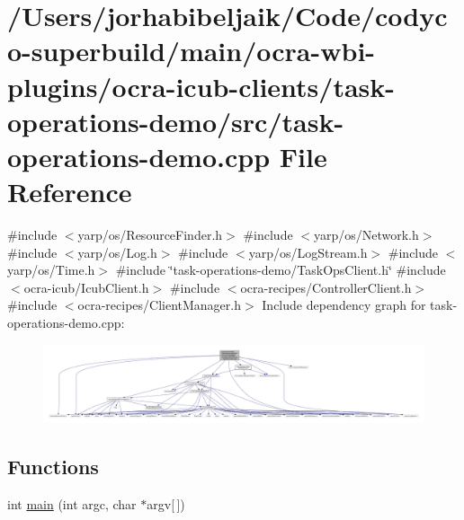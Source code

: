 \hypertarget{task-operations-demo_8cpp}{}\section{/\+Users/jorhabibeljaik/\+Code/codyco-\/superbuild/main/ocra-\/wbi-\/plugins/ocra-\/icub-\/clients/task-\/operations-\/demo/src/task-\/operations-\/demo.cpp File Reference}
\label{task-operations-demo_8cpp}
{\ttfamily \#include $<$yarp/os/\+Resource\+Finder.\+h$>$}\newline
{\ttfamily \#include $<$yarp/os/\+Network.\+h$>$}\newline
{\ttfamily \#include $<$yarp/os/\+Log.\+h$>$}\newline
{\ttfamily \#include $<$yarp/os/\+Log\+Stream.\+h$>$}\newline
{\ttfamily \#include $<$yarp/os/\+Time.\+h$>$}\newline
{\ttfamily \#include \char`\"{}task-\/operations-\/demo/\+Task\+Ops\+Client.\+h\char`\"{}}\newline
{\ttfamily \#include $<$ocra-\/icub/\+Icub\+Client.\+h$>$}\newline
{\ttfamily \#include $<$ocra-\/recipes/\+Controller\+Client.\+h$>$}\newline
{\ttfamily \#include $<$ocra-\/recipes/\+Client\+Manager.\+h$>$}\newline
Include dependency graph for task-\/operations-\/demo.cpp\+:
\nopagebreak
\begin{figure}[H]
\begin{center}
\leavevmode
\includegraphics[width=350pt]{task-operations-demo_8cpp__incl}
\end{center}
\end{figure}
\subsection*{Functions}
\begin{DoxyCompactItemize}
\item 
int \hyperlink{task-operations-demo_8cpp_a0ddf1224851353fc92bfbff6f499fa97}{main} (int argc, char $\ast$argv\mbox{[}$\,$\mbox{]})
\end{DoxyCompactItemize}



